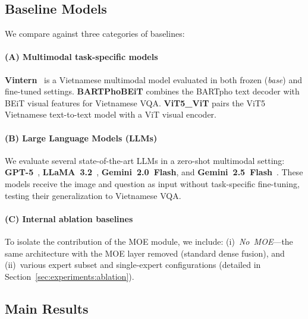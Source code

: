 \subsection{Baseline Models}
\label{sec:experiments:baselines}

We compare against three categories of baselines:

\paragraph{(A) Multimodal task-specific models}
\textbf{Vintern}~\cite{vintern} is a Vietnamese multimodal model evaluated in both frozen (\textit{base}) and fine-tuned settings. \textbf{BARTPhoBEiT} combines the BARTpho text decoder with BEiT visual features for Vietnamese VQA. \textbf{ViT5\_ViT} pairs the ViT5 Vietnamese text-to-text model with a ViT visual encoder.

\paragraph{(B) Large Language Models (LLMs)}
We evaluate several state-of-the-art LLMs in a zero-shot multimodal setting: \textbf{GPT-5}~\cite{openai}, \textbf{LLaMA~3.2}~\cite{touvron2023llama}, \textbf{Gemini~2.0~Flash}, and \textbf{Gemini~2.5~Flash}~\cite{team2023gemini}. These models receive the image and question as input without task-specific fine-tuning, testing their generalization to Vietnamese VQA.

\paragraph{(C) Internal ablation baselines}
To isolate the contribution of the MOE module, we include: (i)~\textit{No~MOE}---the same architecture with the MOE layer removed (standard dense fusion), and (ii)~various expert subset and single-expert configurations (detailed in Section~\ref{sec:experiments:ablation}).

\subsection{Main Results}
\label{sec:experiments:results}

